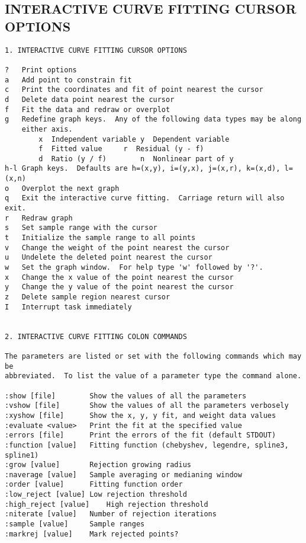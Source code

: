 \subsection{INTERACTIVE CURVE FITTING CURSOR OPTIONS} \label{sec:InteractiveCurveFittingCursorOptions}

\begingroup \fontsize{10pt}{10pt}
\selectfont
\begin{verbatim} 
1. INTERACTIVE CURVE FITTING CURSOR OPTIONS

?	Print options
a	Add point to constrain fit
c	Print the coordinates and fit of point nearest the cursor
d	Delete data point nearest the cursor
f	Fit the data and redraw or overplot
g	Redefine graph keys.  Any of the following data types may be along
	either axis.
	    x  Independent variable	y  Dependent variable
	    f  Fitted value		r  Residual (y - f)
	    d  Ratio (y / f)		n  Nonlinear part of y
h-l	Graph keys.  Defaults are h=(x,y), i=(y,x), j=(x,r), k=(x,d), l=(x,n)
o	Overplot the next graph
q	Exit the interactive curve fitting.  Carriage return will also exit.
r	Redraw graph
s	Set sample range with the cursor
t	Initialize the sample range to all points
v	Change the weight of the point nearest the cursor
u	Undelete the deleted point nearest the cursor
w	Set the graph window.  For help type 'w' followed by '?'.
x	Change the x value of the point nearest the cursor
y	Change the y value of the point nearest the cursor
z	Delete sample region nearest cursor
I	Interrupt task immediately


2. INTERACTIVE CURVE FITTING COLON COMMANDS

The parameters are listed or set with the following commands which may be
abbreviated.  To list the value of a parameter type the command alone.

:show [file]		Show the values of all the parameters
:vshow [file]		Show the values of all the parameters verbosely
:xyshow [file]		Show the x, y, y fit, and weight data values
:evaluate <value>	Print the fit at the specified value
:errors [file]		Print the errors of the fit (default STDOUT)
:function [value]	Fitting function (chebyshev, legendre, spline3, spline1)
:grow [value]		Rejection growing radius
:naverage [value]	Sample averaging or medianing window
:order [value]		Fitting function order
:low_reject [value]	Low rejection threshold
:high_reject [value]	High rejection threshold
:niterate [value]	Number of rejection iterations
:sample [value]		Sample ranges
:markrej [value]	Mark rejected points?


\end{verbatim}
